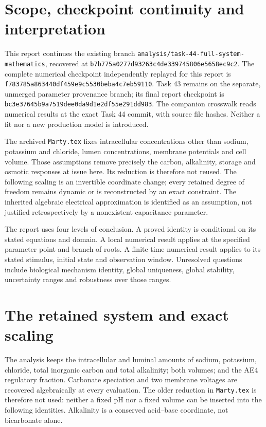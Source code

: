 \section{Scope, checkpoint continuity and interpretation}
This report continues the existing branch
\texttt{analysis/task-44-full-system-mathematics}, recovered at
\nolinkurl{b7b775a0277d93263c4de339745806e5658ec9c2}.
The complete numerical checkpoint independently replayed for this report is
\nolinkurl{f783785a863440df459e9c5530beba4c7eb59110}.
Task 43 remains on the separate, unmerged parameter provenance branch; its
final report checkpoint is
\nolinkurl{bc3e37645b9a7519dee0da9d1e2df55e291dd983}.
The companion crosswalk reads numerical results at the exact Task 44 commit,
with source file hashes. Neither a fit nor a new production model is introduced.

The archived \texttt{Marty.tex} fixes intracellular concentrations other than
sodium, potassium and chloride, lumen concentrations, membrane potentials
and cell volume. Those assumptions remove precisely the carbon, alkalinity,
storage and osmotic responses at issue here. Its reduction is therefore not
reused. The following scaling is an invertible coordinate change; every
retained degree of freedom remains dynamic or is reconstructed by an exact
constraint. The inherited algebraic electrical approximation is identified
as an assumption, not justified retrospectively by a nonexistent capacitance
parameter.

The report uses four levels of conclusion. A proved identity is conditional
on its stated equations and domain. A local numerical result applies at the
specified parameter point and branch of roots. A finite time numerical result
applies to its stated stimulus, initial state and observation window.
Unresolved questions include biological mechanism identity, global uniqueness,
global stability, uncertainty ranges and robustness over those ranges.


\section{The retained system and exact scaling}
\label{m44sec:exact-full-system}
The analysis keeps the intracellular and luminal amounts of sodium,
potassium, chloride, total inorganic carbon and total alkalinity; both
volumes; and the AE4 regulatory fraction.  Carbonate speciation and two
membrane voltages are recovered algebraically at every evaluation.
The older reduction in \texttt{Marty.tex} is therefore not used: neither a
fixed pH nor a fixed volume can be inserted into the following identities.
Alkalinity is a conserved acid--base coordinate, not bicarbonate alone.

